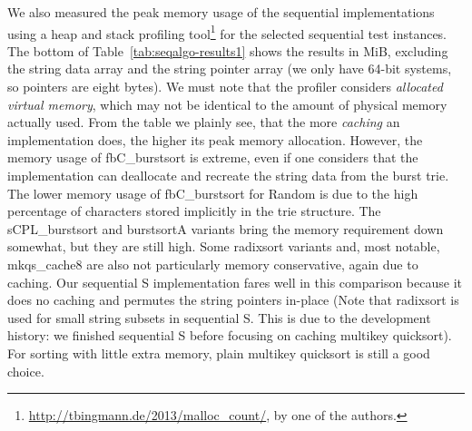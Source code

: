 \documentclass[a4paper]{myjournal}
\begin{document}
We also measured the peak memory usage of the sequential implementations using a
heap and stack profiling
tool\footnote{\url{http://tbingmann.de/2013/malloc_count/}, by one of the
  authors.} for the selected sequential test instances. The bottom of
Table~\ref{tab:seqalgo-results1} shows the results in MiB, excluding the string
data array and the string pointer array (we only have 64-bit systems, so
pointers are eight bytes). We must note that the profiler considers
\emph{allocated virtual memory}, which may not be identical to the amount of
physical memory actually used. From the table we plainly see, that the more
\emph{caching} an implementation does, the higher its peak memory
allocation. However, the memory usage of fbC\_burstsort is extreme, even if one
considers that the implementation can deallocate and recreate the string data
from the burst trie. The lower memory usage of fbC\_burstsort for Random is due
to the high percentage of characters stored implicitly in the trie structure.
The sCPL\_burstsort and burstsortA variants bring the memory requirement down
somewhat, but they are still high. Some radixsort variants and, most notable,
mkqs\_cache8 are also not particularly memory conservative, again due to
caching. Our sequential S implementation fares well in this comparison
because it does no caching and permutes the string pointers in-place (Note that
radixsort is used for small string subsets in sequential S. This is due to
the development history: we finished sequential S before focusing on caching
multikey quicksort). For sorting with little extra memory, plain multikey
quicksort is still a good choice.
\end{document}
